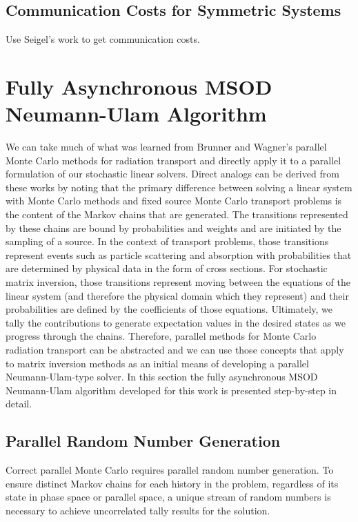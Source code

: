 \subsection{Communication Costs for Symmetric Systems}
\label{sec:symmetric_comm_costs}
Use Seigel's work to get communication costs.

\section{Fully Asynchronous MSOD Neumann-Ulam Algorithm}
\label{sec:asynchronous_algorithm}
We can take much of what was learned from Brunner and Wagner's
parallel Monte Carlo methods for radiation transport and directly
apply it to a parallel formulation of our stochastic linear
solvers. Direct analogs can be derived from these works by noting that
the primary difference between solving a linear system with Monte
Carlo methods and fixed source Monte Carlo transport problems is the
content of the Markov chains that are generated. The transitions
represented by these chains are bound by probabilities and weights and
are initiated by the sampling of a source. In the context of transport
problems, those transitions represent events such as particle
scattering and absorption with probabilities that are determined by
physical data in the form of cross sections. For stochastic matrix
inversion, those transitions represent moving between the equations of
the linear system (and therefore the physical domain which they
represent) and their probabilities are defined by the coefficients of
those equations. Ultimately, we tally the contributions to generate
expectation values in the desired states as we progress through the
chains. Therefore, parallel methods for Monte Carlo radiation
transport can be abstracted and we can use those concepts that apply
to matrix inversion methods as an initial means of developing a
parallel Neumann-Ulam-type solver. In this section the fully
asynchronous MSOD Neumann-Ulam algorithm developed for this work is
presented step-by-step in detail.

\subsection{Parallel Random Number Generation}
\label{subsec:parallel_rng}
Correct parallel Monte Carlo requires parallel random number
generation. To ensure distinct Markov chains for each history in the
problem, regardless of its state in phase space or parallel space, a
unique stream of random numbers is necessary to achieve uncorrelated
tally results for the solution. 

